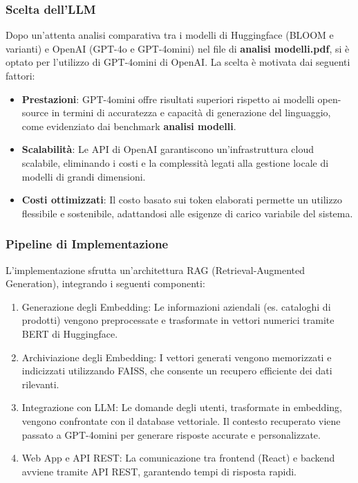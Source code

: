 \subsubsection{Scelta dell'LLM}
Dopo un'attenta analisi comparativa tra i modelli di Huggingface (BLOOM e varianti) e OpenAI (GPT-4o e GPT-4omini) nel file di \textbf{analisi modelli.pdf}, si è optato per l'utilizzo di GPT-4omini di OpenAI. La scelta è motivata dai seguenti fattori:
\begin{itemize}
    \item \textbf{Prestazioni}: GPT-4omini offre risultati superiori rispetto ai modelli open-source in termini di accuratezza e capacità di generazione del linguaggio, come evidenziato dai benchmark \textbf{analisi modelli}.
    \item \textbf{Scalabilità}: Le API di OpenAI garantiscono un'infrastruttura cloud scalabile, eliminando i costi e la complessità legati alla gestione locale di modelli di grandi dimensioni.
    \item \textbf{Costi ottimizzati}: Il costo basato sui token elaborati permette un utilizzo flessibile e sostenibile, adattandosi alle esigenze di carico variabile del sistema.
\end{itemize}

\subsubsection{Pipeline di Implementazione}
L'implementazione sfrutta un'architettura RAG (Retrieval-Augmented Generation), integrando i seguenti componenti:
\begin{enumerate}
    \item Generazione degli Embedding: Le informazioni aziendali (es. cataloghi di prodotti) vengono preprocessate e trasformate in vettori numerici tramite BERT di Huggingface.
    \item Archiviazione degli Embedding: I vettori generati vengono memorizzati e indicizzati utilizzando FAISS, che consente un recupero efficiente dei dati rilevanti.
    \item Integrazione con LLM: Le domande degli utenti, trasformate in embedding, vengono confrontate con il database vettoriale. Il contesto recuperato viene passato a GPT-4omini per generare risposte accurate e personalizzate.
    \item Web App e API REST: La comunicazione tra frontend (React) e backend avviene tramite API REST, garantendo tempi di risposta rapidi.
\end{enumerate}

